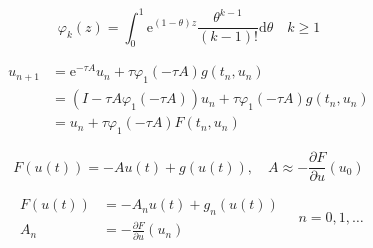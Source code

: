 \begin{equation} 
    \varphi_{k}(z)=\int_{0}^{1} \mathrm{e}^{(1-\theta) z} \frac{\theta^{k-1}}{(k-1) !} \mathrm{d} \theta \quad k \geq 1
\end{equation}

\begin{equation} 
    \begin{aligned} u_{n+1} &=\mathrm{e}^{-\tau A} u_{n}+\tau \varphi_{1}(-\tau A) g\left(t_{n}, u_{n}\right) \\ &=\left(I-\tau A \varphi_{1}(-\tau A)\right) u_{n}+\tau \varphi_{1}(-\tau A) g\left(t_{n}, u_{n}\right) \\ &=u_{n}+\tau \varphi_{1}(-\tau A) F\left(t_{n}, u_{n}\right) \end{aligned}
\end{equation}

\begin{equation} 
    F(u(t))=-A u(t)+g(u(t)), \quad A \approx-\frac{\partial F}{\partial u}\left(u_{0}\right)
\end{equation}

\begin{equation} 
    \begin{aligned} F(u(t)) &=-A_{n} u(t)+g_{n}(u(t)) \\ A_{n} &=-\frac{\partial F}{\partial u}\left(u_{n}\right) \end{aligned} \quad n=0,1, \ldots
\end{equation}